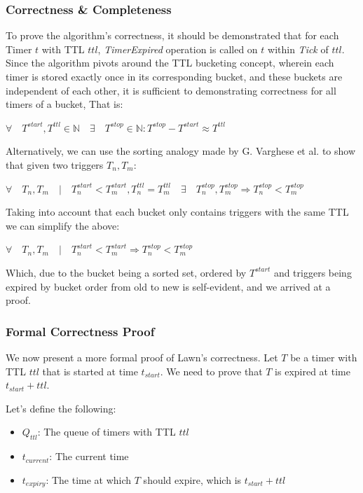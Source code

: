\documentclass[conference]{IEEEtran}
\begin{document}
\subsubsection{Correctness \& Completeness}
To prove the algorithm's correctness, it should be demonstrated that for each Timer $t$ with TTL $ttl$,  \textit{TimerExpired} operation is called on $t$ within \textit{Tick} of $ttl$. Since the algorithm pivots around the TTL bucketing concept, wherein each timer is stored exactly once in its corresponding bucket, and these buckets are independent of each other, it is sufficient to demonstrating correctness for all timers of a bucket, That is:
\begin{center}
	$\forall \quad T^{start}, T^{ttl} \in \mathbb{N} \quad \exists \quad T^{stop} \in \mathbb{N} : T^{stop}-T^{start} \approx T^{ttl}$
\end{center}

Alternatively, we can use the sorting analogy made by G. Varghese et al.\cite{TW} to show that given two triggers $T_n, T_m$: 

\begin{center}
	$\forall \quad T_n, T_m \quad | \quad T^{start}_n<T^{start}_m,  T^{ttl}_n = T^{ttl}_m \quad \exists\quad T^{stop}_n, T^{stop}_m  \Rightarrow T^{stop}_n < T^{stop}_m$
\end{center}

Taking into account that each bucket only contains triggers with the same TTL we can simplify the above:

\begin{center}
	$\forall \quad T_n, T_m \quad | \quad T^{start}_n<T^{start}_m \Rightarrow T^{stop}_n < T^{stop}_m$
\end{center}

Which, due to the bucket being a sorted set, ordered by $T^{start}$ and triggers being expired by bucket order from old to new is self-evident, and we arrived at a proof.

\subsubsection{Formal Correctness Proof}
We now present a more formal proof of Lawn's correctness. Let $T$ be a timer with TTL $ttl$ that is started at time $t_{start}$. We need to prove that $T$ is expired at time $t_{start} + ttl$.

Let's define the following:
\begin{itemize}
    \item $Q_{ttl}$: The queue of timers with TTL $ttl$
    \item $t_{current}$: The current time
    \item $t_{expiry}$: The time at which $T$ should expire, which is $t_{start} + ttl$
\end{itemize}
\end{document}
